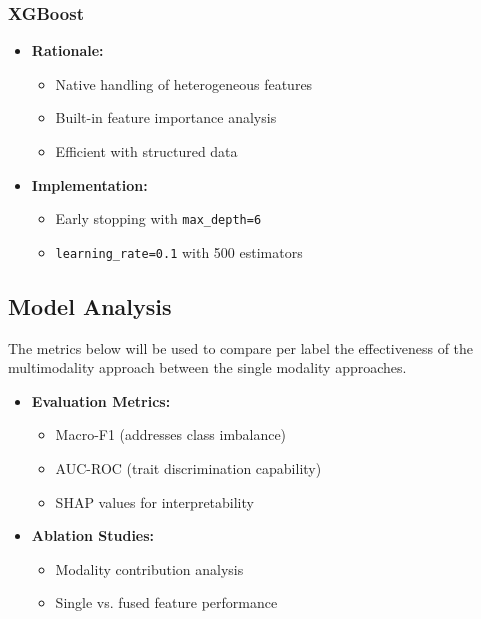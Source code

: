 \subsubsection{XGBoost}
\label{subsubsec:xgboost}

\begin{itemize}
	\item \textbf{Rationale:}
	\begin{itemize}
		\item Native handling of heterogeneous features \cite{chen2016}
		\item Built-in feature importance analysis
		\item Efficient with structured data
	\end{itemize}
	
	\item \textbf{Implementation:}
	\begin{itemize}
		\item Early stopping with \texttt{max\_depth=6}
		\item \texttt{learning\_rate=0.1} with 500 estimators
	\end{itemize}
\end{itemize}


\subsection{Model Analysis}
\label{subsec:analysis}
The metrics below will be used to compare per label the effectiveness of the multimodality approach between the single modality approaches.	 

\begin{itemize}
	\item \textbf{Evaluation Metrics:}
	\begin{itemize}
		\item Macro-F1 (addresses class imbalance)
		\item AUC-ROC (trait discrimination capability)
		\item SHAP values for interpretability
	\end{itemize}
	
	\item \textbf{Ablation Studies:}
	\begin{itemize}
		\item Modality contribution analysis
		\item Single vs. fused feature performance
	\end{itemize}
\end{itemize}

